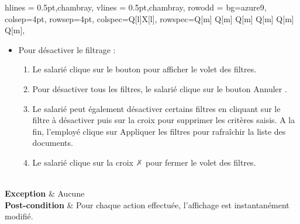 \begin{longtblr}[caption={Description textuelle du cas d’utilisation « Gérer l'affichage des documents »}, , note{3} = {Les filtres actifs s’affichent au-dessus de la section \textbf{Détail du répertoire}.}]{
    hlines = {0.5pt,chambray},
    vlines = {0.5pt,chambray},
    row{odd} = {bg=azure9},
    colsep=4pt,
    rowsep=4pt,
    colspec={Q[l]X[l]},
    rowspec={Q[m] Q[m] Q[m] Q[m] Q[m] Q[m]},
}
\begin{minipage}{\linewidth}
\begin{itemize}[leftmargin=*]
    \begin{enumerate}
        \item Le salarié clique sur le bouton .
        \item Parmi les 5 filtres proposés, le salarié clique sur les filtres souhaités. 
        \item Dans le champ qui s’affiche, le salarié renseigne les critères de filtrage.
        \item Le salarié clique  sur .
        \item Le salarié clique sur la croix \textcolor{gray}{\faClose} pour fermer le volet des filtres.
    \end{enumerate}
    \item Pour désactiver le filtrage :
    \begin{enumerate}
        \item Le salarié clique sur le bouton  pour afficher le volet des filtres.
        \item Pour désactiver tous les filtres, le salarié clique sur le bouton Annuler .
        \item Le salarié peut également désactiver certains filtres en cliquant sur le filtre à désactiver puis sur la croix  pour supprimer les critères saisis.
A la fin, l'employé clique sur Appliquer les filtres pour rafraîchir la liste des documents.
\item Le salarié clique sur la croix \textcolor{gray}{\faClose} pour fermer le volet des filtres.
    \end{enumerate}
\end{itemize}
\end{minipage}
\\
\textbf{Exception} & Aucune
\\
\textbf{Post-condition} & 
Pour chaque action effectuée, l’affichage est instantanément modifié.
\end{longtblr}


